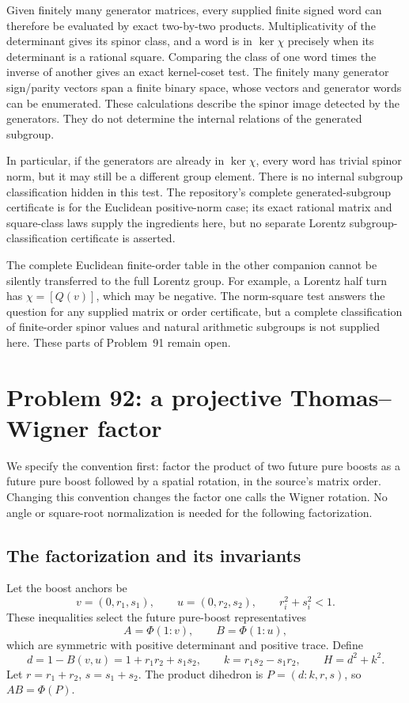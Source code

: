 \documentclass[11pt]{article}
\theoremstyle{remark}
\begin{document}
Given finitely many generator matrices, every supplied finite signed word
can therefore be evaluated by exact two-by-two products. Multiplicativity
of the determinant gives its spinor class, and a word is in \(\ker\chi\)
precisely when its determinant is a rational square. Comparing the class of
one word times the inverse of another gives an exact kernel-coset test.
The finitely many generator sign/parity vectors span a finite binary space,
whose vectors and generator words can be enumerated. These calculations
describe the spinor image detected by the generators. They do not determine
the internal relations of the generated subgroup.

In particular, if the generators are already in \(\ker\chi\), every word
has trivial spinor norm, but it may still be a different group element.
There is no internal subgroup classification hidden in this test. The
repository's complete generated-subgroup certificate is for the Euclidean
positive-norm case; its exact rational matrix and square-class laws supply
the ingredients here, but no separate Lorentz subgroup-classification
certificate is asserted.

The complete Euclidean finite-order table in the other companion cannot be
silently transferred to the full Lorentz group. For example, a Lorentz half
turn has \(\chi=[Q(v)]\), which may be negative. The norm-square test answers
the question for any supplied matrix or order certificate, but a complete
classification of finite-order spinor values and natural arithmetic
subgroups is not supplied here. These parts of Problem~91 remain open.

\section{Problem 92: a projective Thomas--Wigner factor}

We specify the convention first: factor the product of two future pure
boosts as a future pure boost followed by a spatial rotation, in the source's
matrix order. Changing this convention changes the factor one calls the
Wigner rotation. No angle or square-root normalization is needed for the
following factorization.

\subsection{The factorization and its invariants}

Let the boost anchors be
\[
 v=(0,r_1,s_1),\qquad u=(0,r_2,s_2),\qquad
 r_i^2+s_i^2<1.
\]
These inequalities select the future pure-boost representatives
\[
 A=\Phi(1:v),\qquad B=\Phi(1:u),
\]
which are symmetric with positive determinant and positive trace. Define
\begin{equation}
 d=1-B(v,u)=1+r_1r_2+s_1s_2,\qquad
 k=r_1s_2-s_1r_2,\qquad H=d^2+k^2.
 \label{eq:wignerdata}
\end{equation}
Let \(r=r_1+r_2\), \(s=s_1+s_2\). The product dihedron is
\(P=(d:k,r,s)\), so \(AB=\Phi(P)\).
\end{document}
